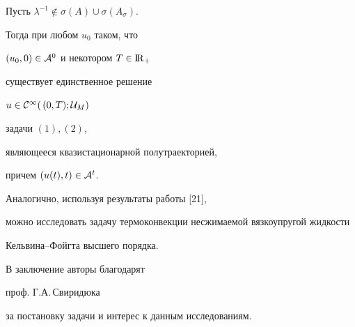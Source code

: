 \begin{thm}


Пусть ${\lambda}^{-1} \notin \sigma (A) \cup \sigma (A_{\sigma})$.


Тогда при любом $u_0$ таком, что


$(u_0,0)\in {\cal A}^0$ и некотором $T \in {{\mathrm I}\!{\mathrm R}}_+$


существует единственное решение


$u \in {\cal C}^{\infty} (\,(0,T);{\cal U}_M)$


задачи $(1), (2)$,


являющееся квазистационарной полутраекторией,


причем $(u(t),t) \in {\cal A}^t$.


\end{thm}





\begin{note}


Аналогично, используя результаты работы [21],


можно исследовать задачу термоконвекции несжимаемой вязкоупругой жидкости


Кельвина--Фойгта высшего порядка.


\end{note}





В заключение авторы благодарят


проф. Г.А.\,Свиридюка


за постановку задачи и интерес к данным исследованиям.





